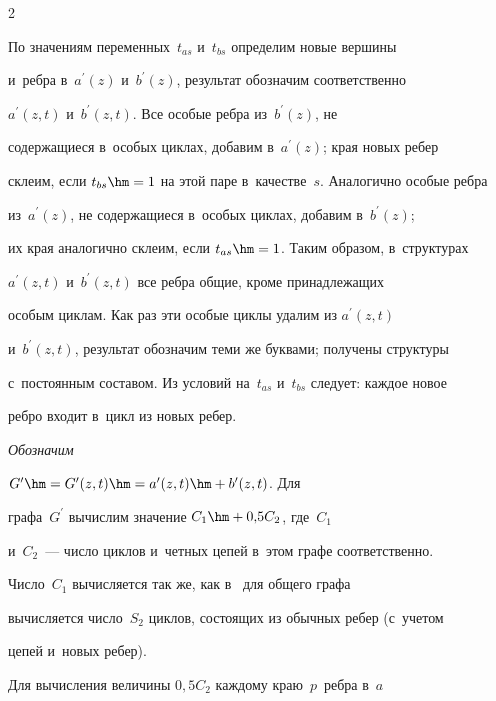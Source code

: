 \begin{multicols}{2}
  


  По значениям переменных~$t_{as}$ и~$t_{bs}$ определим новые вершины 


и~реб\-ра в~$a^\prime(z)$ и~$b^\prime(z)$, результат обозначим соответственно 


$a^\prime(z, t)$ и~$b^\prime(z, t)$. Все особые реб\-ра из~$b^\prime(z)$, не 


содержащиеся в~особых циклах, добавим в~$a^\prime(z)$; края новых ребер 


склеим, если $t_{bs}\hm=1$ на этой паре в~качестве~$s$. Аналогично особые реб\-ра 


из~$a^\prime(z)$, не содержащиеся в~особых циклах, добавим в~$b^\prime(z)$; 


их края аналогично склеим, если $t_{as}\hm=1$. Таким образом, в~структурах 


$a^\prime(z, t)$ и~$b^\prime(z, t)$ все реб\-ра общие, кроме принадлежащих 


особым циклам. Как раз эти особые циклы удалим из $a^\prime(z, t)$ 


и~$b^\prime(z, t)$, результат обозначим теми же буквами; получены структуры 


с~постоянным составом. Из условий на~$t_{as}$ и~$t_{bs}$ следует: каждое новое 


ребро входит в~цикл из новых ребер.


  


  \textit{Обозначим} 


$G^\prime\hm=G^\prime(z, t)\hm=a^\prime(z, t)\hm+b^\prime(z, t)$. Для 


графа~$G^\prime$ вычислим значение $C_1\hm+0{,}5C_2$, где~$C_1$ 


и~$C_2$~--- число циклов и~четных цепей в~этом графе соответственно.


  


  Число~$C_1$ вычисляется так же, как в~\cite{3-gor} для общего графа 


вычисляется число~$S_2$ циклов, состоящих из обычных ребер (с~учетом 


цепей и~новых ре\-бер). 


{





}


  


  Для вычисления величины $0{,}5C_2$ каждому краю~$p$~реб\-ра в~$a$ 



\end{multicols}
